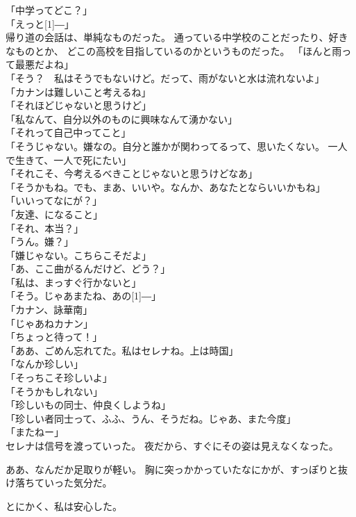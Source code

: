 \documentclass[../IHMain]{subfiles}
\begin{document}
「中学ってどこ？」\\
「えっと\scalebox{3}[1]{―}」\\
帰り道の会話は、単純なものだった。
通っている中学校のことだったり、好きなものとか、
どこの高校を目指しているのかというものだった。
「ほんと雨って最悪だよね」\\
「そう？　私はそうでもないけど。だって、雨がないと水は流れないよ」\\
「カナンは難しいこと考えるね」\\
「それほどじゃないと思うけど」\\
「私なんて、自分以外のものに興味なんて湧かない」\\
「それって自己中ってこと」\\
「そうじゃない。嫌なの。自分と誰かが関わってるって、思いたくない。
一人で生きて、一人で死にたい」\\
「それこそ、今考えるべきことじゃないと思うけどなあ」\\
「そうかもね。でも、まあ、いいや。なんか、あなたとならいいかもね」\\
「いいってなにが？」\\
「友達、になること」\\
「それ、本当？」\\
「うん。嫌？」\\
「嫌じゃない。こちらこそだよ」\\
「あ、ここ曲がるんだけど、どう？」\\
「私は、まっすぐ行かないと」\\
「そう。じゃあまたね、あの\scalebox{3}[1]{―}」\\
「カナン、詠華南」\\
「じゃあねカナン」\\
「ちょっと待って！」\\
「ああ、ごめん忘れてた。私はセレナね。上は時国」\\
「なんか珍しい」\\
「そっちこそ珍しいよ」\\
「そうかもしれない」\\
「珍しいもの同士、仲良くしようね」\\
「珍しい者同士って、ふふ、うん、そうだね。じゃあ、また今度」\\
「またねー」\\
セレナは信号を渡っていった。
夜だから、すぐにその姿は見えなくなった。

ああ、なんだか足取りが軽い。
胸に突っかかっていたなにかが、すっぽりと抜け落ちていった気分だ。

とにかく、私は安心した。\\
\end{document}
